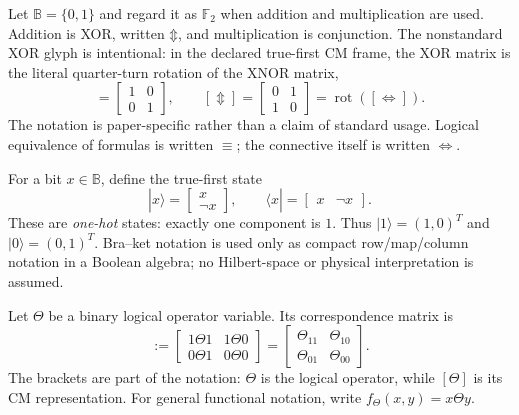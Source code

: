 \documentclass[11pt]{article}
\theoremstyle{definition}
\theoremstyle{remark}
\newcommand{\B}{\mathbb B}
\newcommand{\F}{\mathbb F}
\newcommand{\rot}{\operatorname{rot}}
\newcommand{\xor}{\mathbin{\Updownarrow}}
\begin{document}
Let $\B=\{0,1\}$ and regard it as $\F_2$ when addition and multiplication are used.  Addition is XOR, written $\xor$, and multiplication is conjunction.  The nonstandard XOR glyph is intentional: in the declared true-first CM frame, the XOR matrix is the literal quarter-turn rotation of the XNOR matrix,
\begin{equation}
 [\Leftrightarrow]=\begin{bmatrix}1&0\\0&1\end{bmatrix},\qquad
 [\Updownarrow]=\begin{bmatrix}0&1\\1&0\end{bmatrix}
 =\rot\!\left([\Leftrightarrow]\right).
 \label{eq:xorrotationmotivation}
\end{equation}
The notation is paper-specific rather than a claim of standard usage.  Logical equivalence of formulas is written $\equiv$; the connective itself is written $\Leftrightarrow$.

For a bit $x\in\B$, define the true-first state
\begin{equation}
 |x\rangle=\begin{bmatrix}x\\ \neg x\end{bmatrix},
 \qquad
 \langle x|=\begin{bmatrix}x&\neg x\end{bmatrix}.
 \label{eq:state}
\end{equation}
These are \emph{one-hot} states: exactly one component is $1$.  Thus $|1\rangle=(1,0)^T$ and $|0\rangle=(0,1)^T$.  Bra--ket notation is used only as compact row/map/column notation in a Boolean algebra; no Hilbert-space or physical interpretation is assumed.

Let $\Theta$ be a binary logical operator variable.  Its correspondence matrix is
\begin{equation}
 [\Theta]:=
 \begin{bmatrix}
 1\Theta1&1\Theta0\\
 0\Theta1&0\Theta0
 \end{bmatrix}
 =\begin{bmatrix}\Theta_{11}&\Theta_{10}\\\Theta_{01}&\Theta_{00}\end{bmatrix}.
 \label{eq:binarycm}
\end{equation}
The brackets are part of the notation: $\Theta$ is the logical operator, while $[\Theta]$ is its CM representation.  For general functional notation, write $f_\Theta(x,y)=x\Theta y$.
\end{document}
